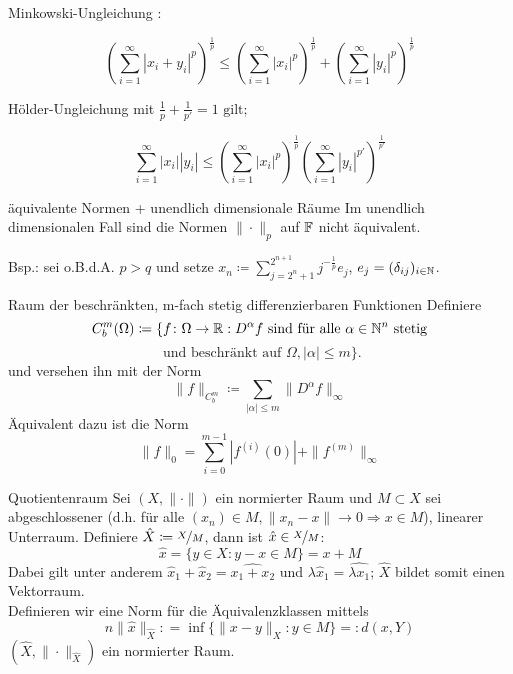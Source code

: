 	\begin{karte}{Minkowski-Ungleichung}
			: 
			
			\[ \left( \sum_{i=1}^{\infty} |x_{i} + y_{i}|^p\right)^{\frac{1}{p}} \leq\left( \sum_{i=1}^{\infty} |x_{i}|^p\right)^{\frac{1}{p}} + \left( \sum_{i=1}^{\infty} |y_{i}|^p\right)^{\frac{1}{p}} \]
	\end{karte}
	
	\begin{karte}{Hölder-Ungleichung}
		 mit $\frac{1}{p} + \frac{1}{p'} = 1 \text{ gilt; }$
		 
		 \[ \sum_{i=1}^{\infty} |x_{i}| |y_{i}| \leq \left( \sum_{i=1}^{\infty} |x_{i}|^{p} \right)^{\frac{1}{p}} \left( \sum_{i=1}^{\infty} |y_{i}|^{p'} \right)^{\frac{1}{p'}} \]	
	\end{karte}
	
	\begin{karte}{äquivalente Normen + unendlich dimensionale Räume}
		Im unendlich dimensionalen Fall sind die Normen $\| \cdot \|_{p}$ auf $\mathbb{F}$ nicht äquivalent.
		
		Bsp.: sei o.B.d.A. $p > q$ und setze $x_{n} \coloneqq \sum_{j = 2^{n} + 1}^{2^{n + 1}} j^{-\frac{1}{p}}e_{j}$, $e_{j} = ( \delta_{ij} )_{i \in \mathbb{N}}$. \\
	\end{karte}
	
	\begin{karte}{Raum der beschränkten, m-fach stetig differenzierbaren Funktionen}	
	Definiere
		\[ C_{b}^{m}(\Omega) \coloneqq \{ f \colon \Omega \rightarrow \mathbb{R} : D^{\alpha}f \text{ sind für alle } \alpha \in \mathbb{N}^{n} \text{ stetig} \] \[ \text{ und beschränkt auf } \Omega, |\alpha| \leq m \}. \]	
		und versehen ihn mit der Norm 
			\[ \| f \|_{C_{b}^{m}} \coloneqq \sum_{|\alpha| \leq m} \| D^{\alpha}f \|_{\infty} \]
		Äquivalent dazu ist die Norm
		\[ \| f \|_{0} = \sum_{i = 0}^{m - 1} |f^{(i)}(0)| + \| f^{(m)} \|_{\infty} \]
	\end{karte}
	
	\begin{karte}{Quotientenraum}		
	Sei $(X, \| \cdot \|)$ ein normierter Raum und $M \subset X$ sei abgeschlossener (d.h. für alle $(x_{n}) \in M, \| x_{n} - x \| \rightarrow 0 \Rightarrow x \in M$), linearer Unterraum.
	Definiere $\hat X \coloneqq \nicefrac{X}{M}$, dann ist $\hat x \in \nicefrac{X}{M}$:
		\[ \hat x = \{ y \in X: y - x \in M \} = x + M \]
	Dabei gilt unter anderem $\hat x_{1} + \hat x_{2} = \widehat{x_{1} + x_{2}}$ und $\lambda \hat x_{1} = \widehat{\lambda x_{1}}$; $\hat X$ bildet somit einen Vektorraum. \\
	Definieren wir eine Norm für die Äquivalenzklassen mittels
		\[n\| \hat x \|_{\hat X} : = \inf \{ \| x - y \|_{X}: y \in M \} =: d(x, Y) \]
	$(\hat X, \| \cdot \|_{\hat X})$ ein normierter Raum.
	\end{karte}